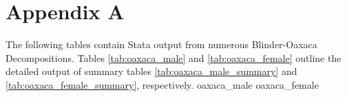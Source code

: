 \documentclass[class=article, crop=false]{standalone}
\begin{document}
\section{Appendix A}
\label{sec:appendixA}
The following tables contain Stata output from numerous Blinder-Oaxaca Decompositions. Tables \ref{tab:oaxaca_male} and \ref{tab:oaxaca_female} outline the detailed output of summary tables \ref{tab:oaxaca_male_summary} and \ref{tab:oaxaca_female_summary}, respectively.
\pagebreak
{}
{oaxaca_male}
{oaxaca_female}

\ifstandalone

\fi
\end{document}
